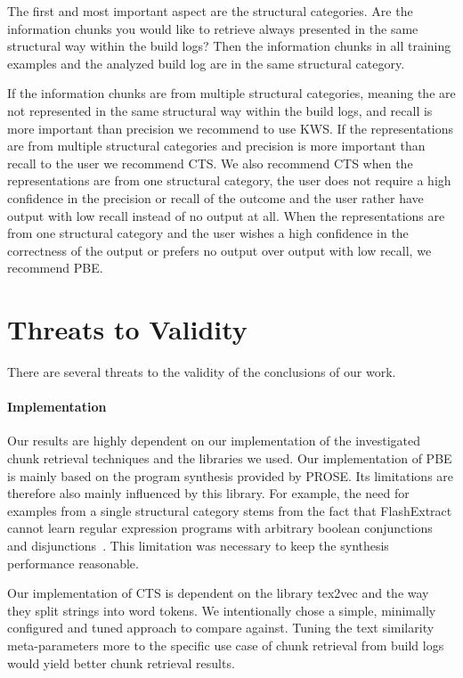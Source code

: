 \documentclass[\myrootdir/main.tex]{subfiles}
\begin{document}
The first and most important aspect are the structural categories.
Are the information chunks you would like to retrieve always presented in the same structural way within the build logs?
Then the information chunks in all training examples and the analyzed build log are in the same structural category.

If the information chunks are from multiple structural categories, meaning the are not represented in the same structural way within the build logs, and recall is more important than precision we recommend to use KWS\@.
If the representations are from multiple structural categories and precision is more important than recall to the user we recommend CTS\@.
We also recommend CTS when the representations are from one structural category, the user does not require a high confidence in the precision or recall of the outcome and the user rather have output with low recall instead of no output at all.
When the representations are from one structural category and the user wishes a high confidence in the correctness of the output or prefers no output over output with low recall, we recommend PBE\@.

\section{Threats to Validity}
There are several threats to the validity of the conclusions of our work.

\paragraph{Implementation}
Our results are highly dependent on our implementation of the investigated chunk retrieval techniques and the libraries we used.
Our implementation of PBE is mainly based on the program synthesis provided by PROSE\@.
Its limitations are therefore also mainly influenced by this library.
For example, the need for examples from a single structural category stems from the fact that FlashExtract cannot learn regular expression programs with arbitrary boolean conjunctions and disjunctions~\cite{mayer2015user}.
This limitation was necessary to keep the synthesis performance reasonable.

Our implementation of CTS is dependent on the library tex2vec and the way they split strings into word tokens.
We intentionally chose a simple, minimally configured and tuned approach to compare against.
Tuning the text similarity meta-parameters more to the specific use case of chunk retrieval from build logs would yield better chunk retrieval results.
\end{document}
